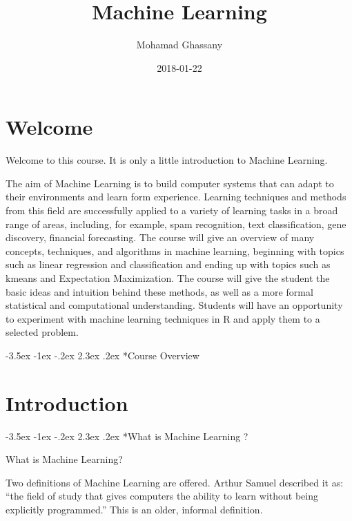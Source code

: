 \documentclass[]{book}
\title{Machine Learning}
\author{Mohamad Ghassany}
\date{2018-01-22}
\makeatletter
\renewcommand\section{\@startsection {section}{1}{\z@}%
                                   {-3.5ex \@plus -1ex \@minus -.2ex}%
                                   {2.3ex \@plus.2ex}%
                                   {\normalfont\Large\bfseries\color{ForestGreen}}}
\theoremstyle{definition}
\theoremstyle{definition}
\theoremstyle{definition}
\theoremstyle{remark}
\makeatother
\begin{document}
\maketitle

{
\setcounter{tocdepth}{2}
\tableofcontents
}
\chapter*{Welcome}\label{welcome}

Welcome to this course. It is only a little introduction to Machine
Learning.

The aim of Machine Learning is to build computer systems that can adapt
to their environments and learn form experience. Learning techniques and
methods from this field are successfully applied to a variety of
learning tasks in a broad range of areas, including, for example, spam
recognition, text classification, gene discovery, financial forecasting.
The course will give an overview of many concepts, techniques, and
algorithms in machine learning, beginning with topics such as linear
regression and classification and ending up with topics such as kmeans
and Expectation Maximization. The course will give the student the basic
ideas and intuition behind these methods, as well as a more formal
statistical and computational understanding. Students will have an
opportunity to experiment with machine learning techniques in R and
apply them to a selected problem.

\section*{Course Overview}\label{course-overview}

\chapter*{Introduction}\label{introduction}

\section*{What is Machine Learning ?}\label{what-is-machine-learning}

What is Machine Learning?

Two definitions of Machine Learning are offered. Arthur Samuel described
it as: ``the field of study that gives computers the ability to learn
without being explicitly programmed.'' This is an older, informal
definition.
\end{document}
